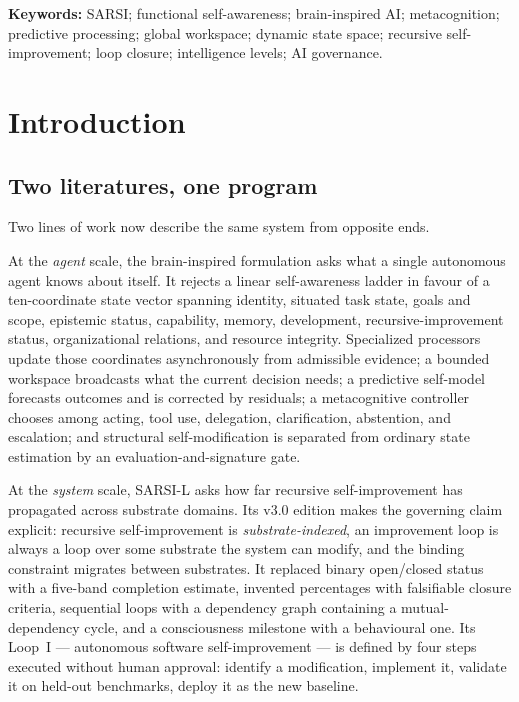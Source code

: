 \documentclass[11pt]{article}
\begin{document}
\begin{abstract}
mapping every published self-model onto the ten canonical coordinates, and report what the deployed console actually measures today against the framework it claims to implement. The framework remains strictly functional: it defines and measures a control capability and makes no claim about consciousness.
\end{abstract}

\vspace{4pt}
\noindent\textbf{Keywords:} SARSI; functional self-awareness; brain-inspired AI; metacognition; predictive processing; global workspace; dynamic state space; recursive self-improvement; loop closure; intelligence levels; AI governance.

\tableofcontents
\newpage

\section{Introduction}
\label{sec:intro}

\subsection{Two literatures, one program}
Two lines of work now describe the same system from opposite ends.

At the \emph{agent} scale, the brain-inspired formulation \citep{yang2026brain} asks what a single autonomous agent knows about itself. It rejects a linear self-awareness ladder in favour of a ten-coordinate state vector spanning identity, situated task state, goals and scope, epistemic status, capability, memory, development, recursive-improvement status, organizational relations, and resource integrity. Specialized processors update those coordinates asynchronously from admissible evidence; a bounded workspace broadcasts what the current decision needs; a predictive self-model forecasts outcomes and is corrected by residuals; a metacognitive controller chooses among acting, tool use, delegation, clarification, abstention, and escalation; and structural self-modification is separated from ordinary state estimation by an evaluation-and-signature gate.

At the \emph{system} scale, SARSI-L \citep{yang2026sarsil} asks how far recursive self-improvement has propagated across substrate domains. Its v3.0 edition makes the governing claim explicit: recursive self-improvement is \emph{substrate-indexed}, an improvement loop is always a loop over some substrate the system can modify, and the binding constraint migrates between substrates. It replaced binary open/closed status with a five-band completion estimate, invented percentages with falsifiable closure criteria, sequential loops with a dependency graph containing a mutual-dependency cycle, and a consciousness milestone with a behavioural one. Its Loop~I --- autonomous software self-improvement --- is defined by four steps executed without human approval: identify a modification, implement it, validate it on held-out benchmarks, deploy it as the new baseline.
\end{document}
